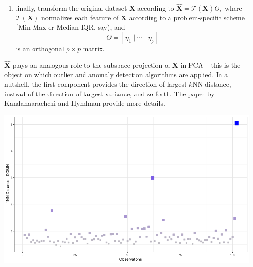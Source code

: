 \documentclass[20pt,landscape,footrule,headrule]{foils}
\newcommand{\newl}{\newline\newline}
\begin{document}
{{\begin{enumerate}
\begin{align*}
\mathbf{y}_{\ell_{b-1}}&=\mathbf{y}_{\ell_{b-2}}-\langle\eta_{b-1} \mid \mathbf{y}_{\ell_{b-2}}\rangle,\quad \ell=1,\ldots, M \\ 
\eta_b&=\frac{\sum_{\ell=1}^M\mathbf{y}_{\ell_{b-1}}}{\left\|\sum_{\ell=1}^M\mathbf{y}_{\ell_{p-1}}\right\|_2},
\end{align*} for $b=1,\ldots,p$;
\newpage\ \item finally, transform the original dataset   $\mathbf{X}$ according to  $\hat{\mathbf{X}}=\mathcal{T}(\mathbf{X})\Theta,$ where $\mathcal{T}(\mathbf{X})$ normalizes each feature of  $\mathbf{X}$ according to a problem-specific scheme  (Min-Max or Median-IQR, say), and $$\Theta=[\eta_1\mid\cdots\mid \eta_p]$$ is an orthogonal $p\times p$ matrix.  
\end{enumerate}
$\hat{\mathbf{X}}$ plays an analogous role to the subspace projection of  $\mathbf{X}$ in PCA -- this is the object on which outlier and anomaly detection algorithms are applied.\newl 
In a nutshell, the first component provides the direction of largest $k$NN distance, instead of the direction of largest variance, and so forth. The paper by Kandanaarachchi and Hyndman provide more details. 
%
\newpage \begin{center}
\includegraphics[width=\textwidth]{Images/11NN_DOBIN}
\end{center}

}}
\end{document}

